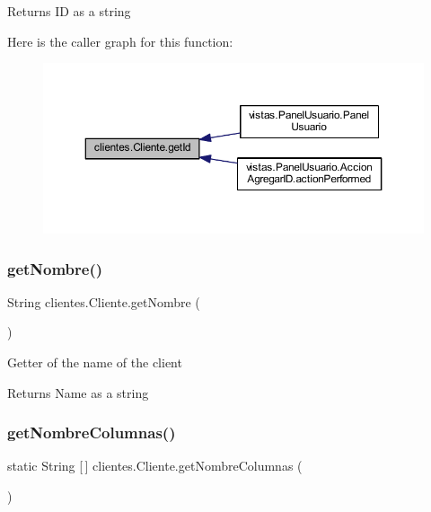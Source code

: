 \begin{DoxyReturn}{Returns}
ID as a string 
\end{DoxyReturn}
Here is the caller graph for this function\+:\nopagebreak
\begin{figure}[H]
\begin{center}
\leavevmode
\includegraphics[width=350pt]{classclientes_1_1_cliente_afbd9530580077a88e7b5f0522d56ee6f_icgraph}
\end{center}
\end{figure}
\mbox{\label{classclientes_1_1_cliente_ace7ec925e4e47251fb01d320b17c95eb}} 
\subsubsection{\texorpdfstring{get\+Nombre()}{getNombre()}}
{\footnotesize\ttfamily String clientes.\+Cliente.\+get\+Nombre (\begin{DoxyParamCaption}{ }\end{DoxyParamCaption})}

Getter of the name of the client

\begin{DoxyReturn}{Returns}
Name as a string 
\end{DoxyReturn}
\mbox{\label{classclientes_1_1_cliente_aaedfb1a4a28af84fb0e22c75d0d9dfdd}} 
\subsubsection{\texorpdfstring{get\+Nombre\+Columnas()}{getNombreColumnas()}}
{\footnotesize\ttfamily static String \mbox{[}$\,$\mbox{]} clientes.\+Cliente.\+get\+Nombre\+Columnas (\begin{DoxyParamCaption}{ }\end{DoxyParamCaption})\hspace{0.3cm}{\ttfamily [static]}}

